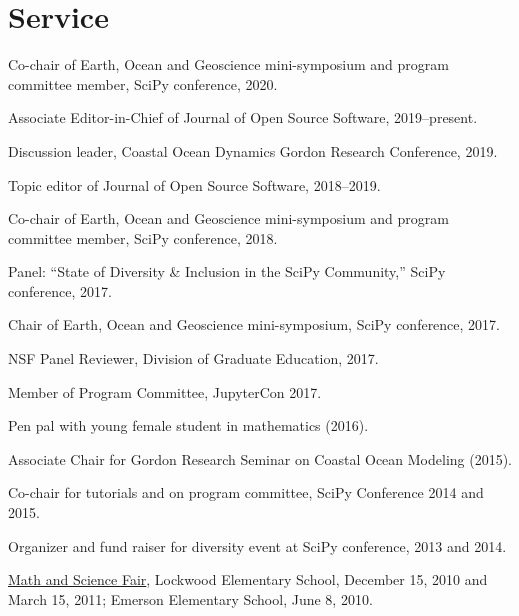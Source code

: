 \documentclass[10pt,letterpaper]{article}
\renewenvironment{itemize}{
  \begin{list}{}{
    \setlength{\leftmargin}{1.5em}
    \setlength{\itemsep}{0.25em}
    \setlength{\parskip}{0pt}
    \setlength{\parsep}{0.25em}
  }
}{
  \end{list}
}
\begin{document}
\section*{Service}
\begin{itemize}
  \item Co-chair of Earth, Ocean and Geoscience mini-symposium and program committee member, SciPy conference, 2020.
  \item Associate Editor-in-Chief of Journal of Open Source Software, 2019--present.
  \item Discussion leader, Coastal Ocean Dynamics Gordon Research Conference, 2019.
  \item Topic editor of Journal of Open Source Software, 2018--2019.
  \item Co-chair of Earth, Ocean and Geoscience mini-symposium and program committee member, SciPy conference, 2018.
  \item Panel: ``State of Diversity \& Inclusion in the SciPy Community,'' SciPy conference, 2017.
  \item Chair of Earth, Ocean and Geoscience mini-symposium, SciPy conference, 2017.
  \item NSF Panel Reviewer, Division of Graduate Education, 2017.
  \item Member of Program Committee, JupyterCon 2017.
  \item Pen pal with young female student in mathematics (2016).
  \item Associate Chair for Gordon Research Seminar on Coastal Ocean Modeling (2015).
  \item Co-chair for tutorials and on program committee, SciPy Conference 2014 and 2015.
  \item Organizer and fund raiser for diversity event at SciPy conference, 2013 and 2014.
	\item \href{http://www.amath.washington.edu/~siamuw/math-fair.html}{Math and Science Fair}, Lockwood Elementary School, December 15, 2010 and March 15, 2011; Emerson Elementary School, June 8, 2010.

\end{itemize}
\end{document}
